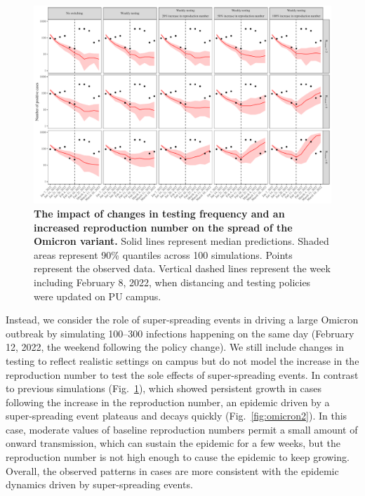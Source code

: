 \documentclass[12pt]{article}
\newcommand{\fref}[1]{Fig.~\ref{fig:#1}}
\begin{document}
\begin{figure}[!thp]
\includegraphics[width=\textwidth]{../figure_princeton_new/figure_princeton_simulation_omicron_spring.pdf}
\caption{
\textbf{The impact of changes in testing frequency and an increased reproduction number on the spread of the Omicron variant.}
Solid lines represent median predictions.
Shaded areas represent 90\% quantiles across 100 simulations.
Points represent the observed data.
Vertical dashed lines represent the week including February 8, 2022, when distancing and testing policies were updated on PU campus.
}
\label{fig:omicron1}
\end{figure}

Instead, we consider the role of super-spreading events in driving a large Omicron outbreak by simulating 100--300 infections happening on the same day (February 12, 2022, the weekend following the policy change).
We still include changes in testing to reflect realistic settings on campus but do not model the increase in the reproduction number to test the sole effects of super-spreading events.
In contrast to previous simulations (\fref{omicron1}), which showed persistent growth in cases following the increase in the reproduction number, an epidemic driven by a super-spreading event plateaus and decays quickly (\fref{omicron2}).
In this case, moderate values of baseline reproduction numbers permit a small amount of onward transmission, which can sustain the epidemic for a few weeks, but the reproduction number is not high enough to cause the epidemic to keep growing.
Overall, the observed patterns in cases are more consistent with the epidemic dynamics driven by super-spreading events.
\end{document}
